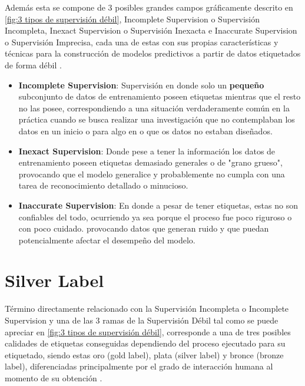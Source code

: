Además esta se compone de 3 posibles grandes campos gráficamente descrito en \ref{fig:3 tipos de supervisión débil}, Incomplete Supervision o Supervisión Incompleta, Inexact Supervision o Supervisión Inexacta e Inaccurate Supervision o Supervisión Imprecisa, cada una de estas con sus propias características y técnicas para la construcción de modelos predictivos a partir de datos etiquetados de forma débil \parencite{WeaklySupervisedLearning2017}. 

\begin{itemize}
  \item \textbf{Incomplete Supervision}: Supervisión en donde solo un \textbf{pequeño} subconjunto de datos de entrenamiento poseen etiquetas mientras que el resto no las posee, correspondiendo a una situación verdaderamente común en la práctica cuando se busca realizar una investigación que no contemplaban los datos en un inicio o para algo en o que os datos no estaban diseñados.

  \item \textbf{Inexact Supervision}: Donde pese a tener la información los datos de entrenamiento poseen etiquetas demasiado generales o de "grano grueso", provocando que el modelo generalice y probablemente no cumpla con una tarea de reconocimiento detallado o minucioso.
    
  \item \textbf{Inaccurate Supervision}: En donde a pesar de tener etiquetas, estas no son confiables del todo, ocurriendo ya sea porque el proceso fue poco riguroso o con poco cuidado. provocando datos que generan ruido y que puedan potencialmente afectar el desempeño del modelo.
\end{itemize}

\section{Silver Label}
\label{sec:silver_label}
Término directamente relacionado con la Supervisión Incompleta o Incomplete Supervision y una de las 3 ramas de la Supervisión Débil \cite{WeaklySupervisedLearning2017} tal como se puede apreciar en \ref{fig:3 tipos de supervisión débil}, corresponde a una de tres posibles calidades de etiquetas conseguidas dependiendo del proceso ejecutado para su etiquetado, siendo estas oro (gold label), plata (silver label) y bronce (bronze label), diferenciadas principalmente por el grado de interacción humana al momento de su obtención \cite{SilverLabel2024}.

